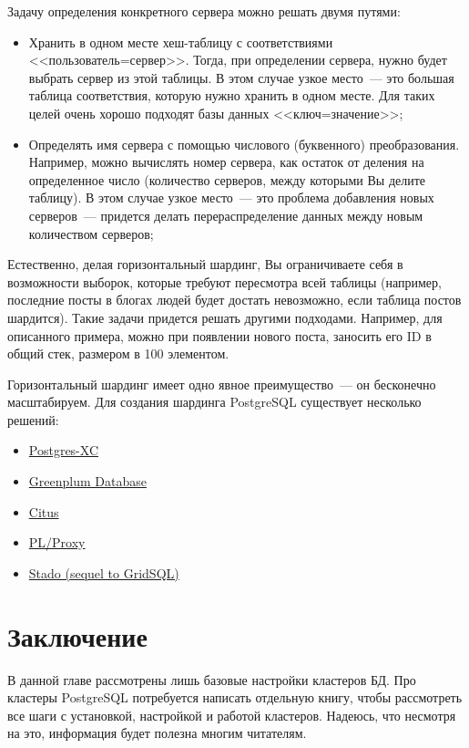 Задачу определения конкретного сервера можно решать двумя путями:

\begin{itemize}
  \item Хранить в одном месте хеш-таблицу с соответствиями <<пользователь=сервер>>. Тогда, при определении сервера, нужно будет выбрать сервер из этой таблицы. В этом случае узкое место~--- это большая таблица соответствия, которую нужно хранить в одном месте. Для таких целей очень хорошо подходят базы данных <<ключ=значение>>;
  \item Определять имя сервера с помощью числового (буквенного) преобразования. Например, можно вычислять номер сервера, как остаток от деления на определенное число (количество серверов, между которыми Вы делите таблицу). В этом случае узкое место~--- это проблема добавления новых серверов~--- придется делать перераспределение данных между новым количеством серверов;
\end{itemize}

Естественно, делая горизонтальный шардинг, Вы ограничиваете себя в возможности выборок, которые требуют пересмотра всей таблицы (например, последние посты в блогах людей будет достать невозможно, если таблица постов шардится). Такие задачи придется решать другими подходами. Например, для описанного примера, можно при появлении нового поста, заносить его ID в общий стек, размером в 100 элементом.

Горизонтальный шардинг имеет одно явное преимущество~--- он бесконечно масштабируем. Для создания шардинга PostgreSQL существует несколько решений:

\begin{itemize}
  \item \href{http://postgres-xc.sourceforge.net/}{Postgres-XC}
  \item \href{http://www.greenplum.com/products/greenplum-database}{Greenplum Database}
  \item \href{https://github.com/citusdata/citus}{Citus}
  \item \href{http://plproxy.projects.postgresql.org/doc/tutorial.html}{PL/Proxy}
  \item \href{https://launchpad.net/stado}{Stado (sequel to GridSQL)}
\end{itemize}









\section{Заключение}

В данной главе рассмотрены лишь базовые настройки кластеров БД. Про кластеры PostgreSQL потребуется написать отдельную книгу, чтобы рассмотреть все шаги с установкой, настройкой и работой кластеров. Надеюсь, что несмотря на это, информация будет полезна многим читателям.
